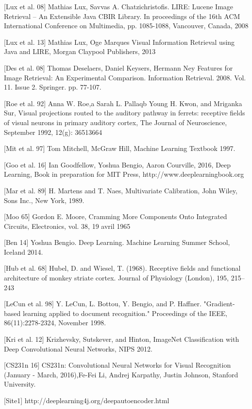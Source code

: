 [Lux et al. 08] Mathias Lux, Savvas A. Chatzichristofis. LIRE: Lucene Image Retrieval – An Extensible Java CBIR Library. In proceedings of the 16th ACM International Conference on Multimedia, pp. 1085-1088, Vancouver, Canada, 2008

[Lux et al. 13] Mathias Lux, Oge Marques Visual Information Retrieval using Java and LIRE, Morgan Claypool Publishers, 2013

[Des et al. 08] Thomas Deselaers, Daniel Keysers, Hermann Ney Features for Image Retrieval: An Experimental Comparison. Information Retrieval. 2008. Vol. 11. Issue 2. Springer. pp. 77-107.

[Roe et al. 92] Anna W. Roe,a Sarah L. Pallaqb Young H. Kwon, and Mriganka Sur, Visual projections routed to the auditory pathway in ferrets: receptive fields of visual neurons in primary auditory cortex, The Journal of Neuroscience, September 1992, 12(g): 36513664

[Mit et al. 97] Tom Mitchell, McGraw Hill, Machine Learning Textbook 1997.

[Goo et al. 16] Ian Goodfellow, Yoshua Bengio, Aaron Courville, 2016, Deep Learning, Book in preparation for MIT Press, http://www.deeplearningbook.org

[Mar et al. 89] H. Martens and T. Naes, Multivariate Calibration, John Wiley, Sons Inc., New York, 1989.

[Moo 65] Gordon E. Moore, Cramming More Components Onto Integrated Circuits, Electronics, vol. 38,‎ 19 avril 1965

[Ben 14] Yoshua Bengio. Deep Learning. Machine Learning Summer School, Iceland 2014.

[Hub et al. 68] Hubel, D. and Wiesel, T. (1968). Receptive fields and functional architecture of monkey striate cortex. Journal of Physiology (London), 195, 215–243

[LeCun et al. 98] Y. LeCun, L. Bottou, Y. Bengio, and P. Haffner. "Gradient-based learning applied to document recognition." Proceedings of the IEEE, 86(11):2278-2324, November 1998. 

[Kri et al. 12] Krizhevsky, Sutskever, and Hinton, ImageNet Classification with Deep Convolutional Neural Networks, NIPS 2012.

[CS231n 16] CS231n: Convolutional Neural Networks for Visual Recognition (January - March, 2016),Fe-Fei Li, Andrej Karpathy, Justin Johnson, Stanford University.

[Site1] http://deeplearning4j.org/deepautoencoder.html

